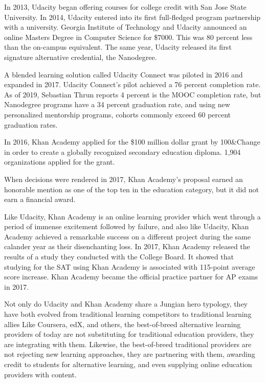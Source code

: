 \documentclass[review]{elsarticle}
\begin{document}
    In 2013, Udacity began offering courses for college credit with San Jose State University\cite{shen_2015}.
    In 2014, Udacity entered into its first full-fledged program partnership with a university.
    Georgia Institute of Technology and Udacity announced an online Masters Degree in Computer Science for \$7000.
    This was 80 percent less than the on-campus equivalent\cite{onink2013georgia}.
    The same year, Udacity released its first signature alternative credential, the Nanodegree.

    A blended learning solution called Udacity Connect was piloted in 2016 and expanded in 2017.
    Udacity Connect's pilot achieved a 76 percent completion rate\cite{shah_2018}.
    As of 2019, Sebastian Thrun reports 4 percent is the MOOC completion rate,
    but Nanodegree programs have a 34 percent graduation rate, and using new personalized mentorship programs, cohorts commonly exceed 60 percent graduation rates.

    In 2016, Khan Academy applied for the \$100 million dollar grant
    by 100\&Change in order to create a globally recognized secondary education diploma.
    1,904 organizations applied for the grant\cite{conrad_2016}.

    
    When decisions were rendered in 2017, Khan Academy's proposal earned an honorable mention as one of the top ten in the education category,
    but it did not earn a financial award\cite{cushing_2017}.

    Like Udacity, Khan Academy is an online learning provider which went through a period of immense excitement followed by failure,
    and also like Udacity, Khan Academy achieved a remarkable success on a different project during the same calander year as their disenchanting loss.
    In 2017, Khan Academy released the results of a study they conducted with the College Board.
    It showed that studying for the SAT using Khan Academy is associated with 115-point average score increase\cite{khan_academy_sat_2017}.
    Khan Academy became the official practice partner for AP exams in 2017\cite{khan_academy_partner_2017}.

    Not only do Udacity and Khan Academy share a Jungian hero typology,
    they have both evolved from traditional learning competitors to traditional learning allies
    Like Coursera, edX, and others, the best-of-breed alternative learning providers of today are not substituting for traditional education providers,
    they are integrating with them. Likewise, the best-of-breed traditional providers are not rejecting new learning approaches,
    they are partnering with them, awarding credit to students for alternative learning, and even supplying online education providers with content.
\end{document}
